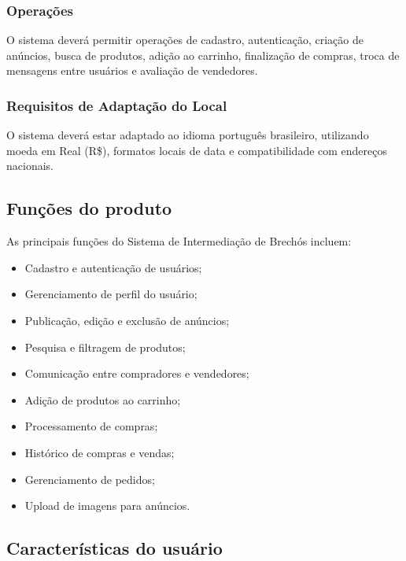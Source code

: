 \documentclass[
	article,			%
	11pt,				%
	oneside,			%
	a4paper,			%
	english,			%
	brazil,				%
	sumario=tradicional
	]{abntex2}
\begin{document}
\subsubsection{Operações}
\label{sec:Operacoes}

O sistema deverá permitir operações de cadastro, autenticação, criação de anúncios, busca de produtos, adição ao carrinho, finalização de compras, troca de mensagens entre usuários e avaliação de vendedores.

\subsubsection{Requisitos de Adaptação do Local}
\label{sec:RequisitosLocal}

O sistema deverá estar adaptado ao idioma português brasileiro, utilizando moeda em Real (R\$), formatos locais de data e compatibilidade com endereços nacionais.

\subsection{Funções do produto}
\label{sec:FuncoesProduto}

As principais funções do Sistema de Intermediação de Brechós incluem:

\begin{itemize}
    \item Cadastro e autenticação de usuários;
    \item Gerenciamento de perfil do usuário;
    \item Publicação, edição e exclusão de anúncios;
    \item Pesquisa e filtragem de produtos;
    \item Comunicação entre compradores e vendedores;
    \item Adição de produtos ao carrinho;
    \item Processamento de compras;
    \item Histórico de compras e vendas;
    \item Gerenciamento de pedidos;
    \item Upload de imagens para anúncios.
\end{itemize}

\subsection{Características do usuário}
\label{sec:CaracteristicasUsuario}
\end{document}
